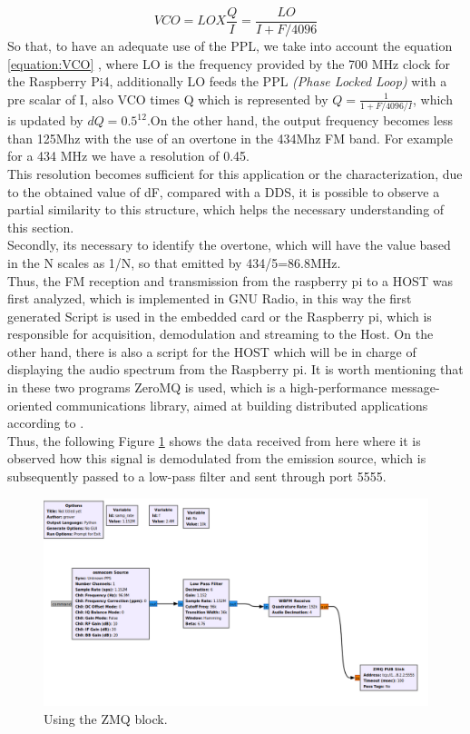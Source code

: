 \documentclass[12pt, twoside]{report}
\begin{document}
\begin{equation}
    VCO=LO X \frac{Q}{I}= \frac{LO}{I+F/4096}
    \label{equation:VCO}
\end{equation}
So that, to have an adequate use of the PPL, we take into account the equation \ref{equation:VCO} , where LO is the frequency provided by the 700 MHz clock for the Raspberry Pi4, additionally LO feeds the PPL \textit{(Phase Locked Loop)} with a pre scalar of I, also VCO times Q which is represented by $Q=\frac{1}{1+ F/4096/I}$, which is updated by $dQ=0.5^{12}$.On the other hand, the output frequency becomes less than 125Mhz with the use of an overtone in the 434Mhz FM band. For example for a 434 MHz we have a resolution of 0.45. \\%
This resolution becomes sufficient for this application or the characterization, due to the obtained value of dF, compared with a DDS, it is possible to observe a partial similarity to this structure, which helps the necessary understanding of this section.\\
Secondly, its necessary to identify the overtone, which will have the value based in the N scales as 1/N, so that emitted by 434/5=86.8MHz.\\
Thus, the FM reception and transmission from the raspberry pi to a HOST was first analyzed, which is implemented in GNU Radio, in this way the first generated Script is used in the embedded card or the Raspberry pi, which is responsible for acquisition, demodulation and streaming to the Host. On the other hand, there is also a script for the HOST which will be in charge of displaying the audio spectrum from the Raspberry pi. It is worth mentioning that in these two programs ZeroMQ is used, which is a high-performance message-oriented communications library, aimed at building distributed applications according to \cite{Simmonds2015}.\\
Thus, the following Figure \ref{fig:ZMQ1} shows the data received from here where it is observed how this signal is demodulated from the emission source, which is subsequently passed to a low-pass filter and sent through port 5555.\\
\begin{figure}[!h]
\centering
  \includegraphics[width=\linewidth]{images/zmq pub.png}
  \caption{Using the ZMQ block.}
  \label{fig:ZMQ1}
\end{figure}
\end{document}
